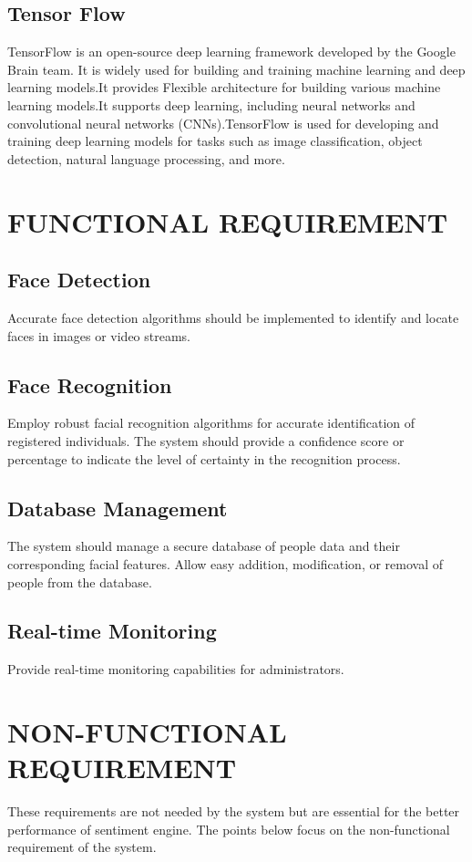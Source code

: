             \subsection{Tensor Flow}
TensorFlow is an open-source deep learning framework developed by the Google Brain team. It is widely used for building and training machine learning and deep learning models.It provides Flexible architecture for building various machine learning models.It supports deep learning, including neural networks and convolutional neural networks (CNNs).TensorFlow is used for developing and training deep learning models for tasks such as image classification, object detection, natural language processing, and more.
   \section{FUNCTIONAL REQUIREMENT}
\subsection{Face Detection}
Accurate face detection algorithms should be implemented to identify and locate faces in images or video streams.
\subsection{Face Recognition}
Employ robust facial recognition algorithms for accurate identification of registered individuals.
The system should provide a confidence score or percentage to indicate the level of certainty in the recognition process.
\subsection{Database Management}
The system should manage a secure database of people data and their corresponding facial features.
Allow easy addition, modification, or removal of people from the database.

\subsection{Real-time Monitoring}
Provide real-time monitoring capabilities for administrators.

 \section{NON-FUNCTIONAL REQUIREMENT}
These requirements are not needed by the system but are essential for the better
performance of sentiment engine. The points below focus on the non-functional
requirement of the system.
